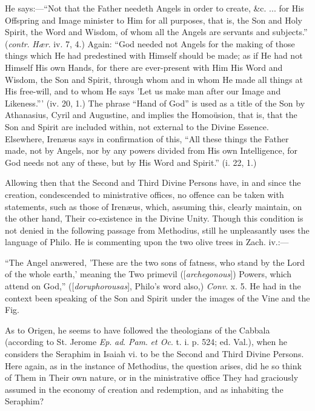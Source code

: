 He says:—``Not that the Father needeth Angels in order to
create, \&c. ... for His Offspring and Image minister to Him for
all purposes, that is, the Son and Holy Spirit, the Word and Wisdom,
of whom all the Angels are servants and subjects.'' (\emph{contr}.
\emph{Hær}. iv. 7, 4.) Again: ``God needed not Angels for the
making of those things which He had predestined with Himself should be
made; as if He had not Himself His own Hands, for there are
ever-present with Him His Word and Wisdom, the Son and Spirit, through
whom and in whom He made all things at His free-will, and to whom He
says 'Let us make man after our Image and Likeness.''' (iv. 20,
1.) The phrase ``Hand of God'' is used as a title of the Son
by Athanasius, Cyril and Augustine, and implies the Homoüsion, that
is, that the Son and Spirit are included within, not external to the
Divine Essence. Elsewhere, Irenæus says in confirmation of this,
``All these things the Father made, not by Angels, nor by any
powers divided from His own Intelligence, for God needs not any of
these, but by His Word and Spirit.'' (i. 22, 1.)

Allowing then that the Second and Third Divine Persons have, in and
since the creation, condescended to ministrative offices, no offence
can be taken with statements, such as those of Irenæus, which,
assuming this, clearly maintain, on the other hand, Their co-existence
in the Divine Unity. Though this condition is not denied in the
following passage from Methodius, still he unpleasantly uses the
language of Philo. He is commenting upon the two olive trees in Zach.
iv.:—

``The Angel answered, 'These are the two sons of fatness, who
stand by the Lord of the whole earth,' meaning the Two primevil ([\emph{archegonous}]) Powers, which attend on God,'' ([\emph{doruphorousas}],
Philo's word also,) \emph{Conv}. x. 5. He had in the context been
speaking of the Son and Spirit under the images of the Vine and
the Fig.

As to Origen, he seems to have followed the theologians of the
Cabbala (according to St. Jerome \emph{Ep}. \emph{ad}. \emph{Pam}. \emph{et
Oc}. t. i. p. 524; ed. Val.), when he considers the Seraphim in
Isaiah vi. to be the Second and Third Divine Persons. Here again, as
in the instance of Methodius, the question arises, did he so think of
Them in Their own nature, or in the ministrative office They had
graciously assumed in the economy of creation and redemption, and as
inhabiting the Seraphim?


